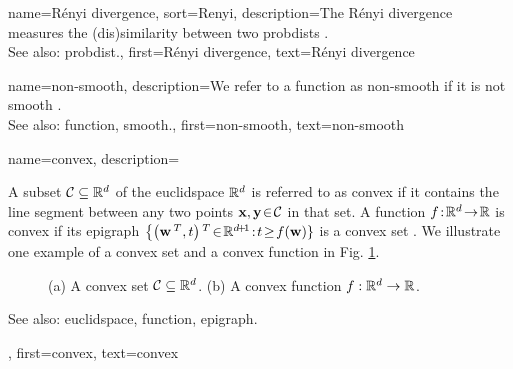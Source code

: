 {name={R\'enyi divergence}, 
sort={Renyi},
	description={The R\'enyi divergence measures the (dis)similarity 
		between two \glspl{probdist} \cite{RenyiInfo95}.
				\\
		See also: \gls{probdist}.}, 
	first={R\'enyi divergence}, 
	text={R\'enyi divergence}
} 

{name={non-smooth},
	description={We refer to a \gls{function} as non-smooth if it is not 
		\gls{smooth} \cite{nesterov04}.
				\\
		See also: \gls{function}, \gls{smooth}.},
	first={non-smooth},
	text={non-smooth}
}

{name={convex},
	description={A subset $\mathcal{C} \subseteq \mathbb{R}^{d}$ of the 
		\gls{euclidspace} $\mathbb{R}^{d}$ is referred to as convex if it contains 
		the line segment between any two points ${\bf x}, {\bf y}\!\in\!\mathcal{C}$ in that set. A \gls{function}  
		$f\!:\!\mathbb{R}^{d}\!\rightarrow\!\mathbb{R}$ 
		is convex if its \gls{epigraph} $\big\{ \big( \weights\,^{T},t \big)\,^{T}\!\in\!\mathbb{R}^{\dimlocalmodel\!+\!1}\!:\!t\!\geq\!f(\weights) \}$ 
		is a convex set \cite{BoydConvexBook}. We illustrate one example of a convex set 
		and a convex \gls{function} in Fig. \ref{fig_convex_set_function_dict}. 
		\begin{figure}[H]
		\begin{center}
			\vspace*{-8mm}
			\end{center}
			\caption{(a) A convex set $\mathcal{C} \subseteq \mathbb{R}^{d}$. 
				(b) A convex \gls{function} $f: \mathbb{R}^{d} \rightarrow \mathbb{R}$.\label{fig_convex_set_function_dict}}
		\end{figure}
		See also: \gls{euclidspace}, \gls{function}, \gls{epigraph}.},
	first={convex},
	text={convex}
}


